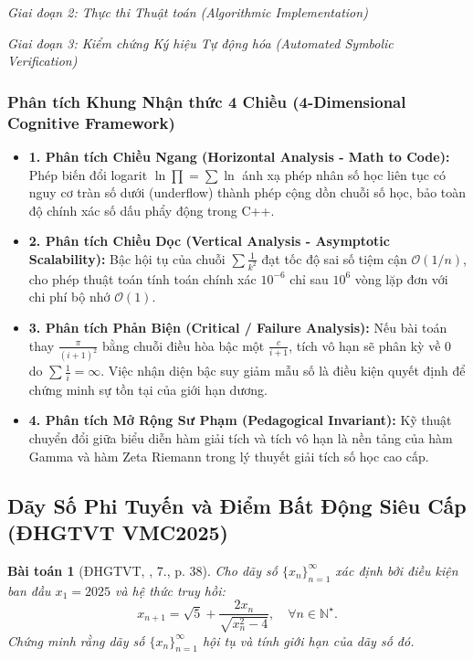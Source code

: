 \documentclass{article}
\newtheorem{baitoan}{Bài toán}
\begin{document}
\vspace{0.5em}\noindent\emph{Giai đoạn 2: Thực thi Thuật toán (Algorithmic Implementation)}


\vspace{0.5em}\noindent\emph{Giai đoạn 3: Kiểm chứng Ký hiệu Tự động hóa (Automated Symbolic Verification)}


\subsubsection*{Phân tích Khung Nhận thức 4 Chiều (4-Dimensional Cognitive Framework)}
\begin{itemize}
    \item \textbf{1. Phân tích Chiều Ngang (Horizontal Analysis - Math to Code):} Phép biến đổi logarit $\ln \prod = \sum \ln$ ánh xạ phép nhân số học liên tục có nguy cơ tràn số dưới (underflow) thành phép cộng dồn chuỗi số học, bảo toàn độ chính xác số dấu phẩy động trong C++.
    \item \textbf{2. Phân tích Chiều Dọc (Vertical Analysis - Asymptotic Scalability):} Bậc hội tụ của chuỗi $\sum \frac{1}{k^2}$ đạt tốc độ sai số tiệm cận $\mathcal{O}(1/n)$, cho phép thuật toán tính toán chính xác $10^{-6}$ chỉ sau $10^6$ vòng lặp đơn với chi phí bộ nhớ $\mathcal{O}(1)$.
    \item \textbf{3. Phân tích Phản Biện (Critical / Failure Analysis):} Nếu bài toán thay $\frac{\pi}{(i+1)^2}$ bằng chuỗi điều hòa bậc một $\frac{c}{i+1}$, tích vô hạn sẽ phân kỳ về $0$ do $\sum \frac{1}{i} = \infty$. Việc nhận diện bậc suy giảm mẫu số là điều kiện quyết định để chứng minh sự tồn tại của giới hạn dương.
    \item \textbf{4. Phân tích Mở Rộng Sư Phạm (Pedagogical Invariant):} Kỹ thuật chuyển đổi giữa biểu diễn hàm giải tích và tích vô hạn là nền tảng của hàm Gamma và hàm Zeta Riemann trong lý thuyết giải tích số học cao cấp.
\end{itemize}

\subsection{Dãy Số Phi Tuyến và Điểm Bất Động Siêu Cấp (ĐHGTVT VMC2025)}

\begin{baitoan}[ĐHGTVT, \cite{VMS_VMC2025}, 7., p. 38]
Cho dãy số $\{x_n\}_{n=1}^\infty$ xác định bởi điều kiện ban đầu $x_1 = 2025$ và hệ thức truy hồi:
\begin{equation}
    x_{n+1} = \sqrt{5} + \frac{2x_n}{\sqrt{x_n^2 - 4}}, \quad \forall n\in\mathbb{N}^\star.
\end{equation}
Chứng minh rằng dãy số $\{x_n\}_{n=1}^\infty$ hội tụ và tính giới hạn của dãy số đó.
\end{baitoan}
\end{document}
